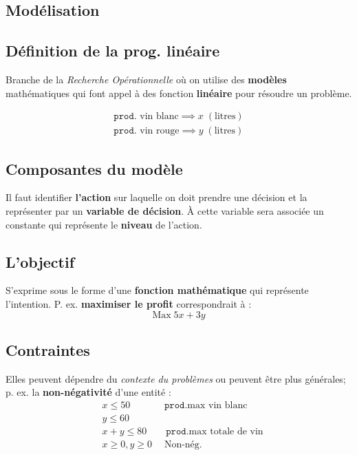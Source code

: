 \documentclass{report}
\begin{document}
\begin{multicols*}{3}
    \chapter{Modélisation}
    \footnotesize
\section{Définition de la prog. linéaire}

    Branche de la \textit{Recherche Opérationnelle} où on utilise 
    des \textbf{modèles} mathématiques qui font appel à 
    des fonction \textcolor{myb}{\textbf{linéaire}} pour 
    résoudre un problème. 

    \begin{align*}
        \texttt{prod}. \text{ vin blanc} \implies x \; (\text{litres}) \\ 
        \texttt{prod}. \text{ vin rouge} \implies y \; (\text{litres})
    \end{align*}
\section{Composantes du modèle}
    Il faut identifier \textbf{\textcolor{myb}{l'action}} sur 
    laquelle on doit prendre une décision et la représenter 
    par un \textbf{\textcolor{myb}{variable de décision}}. À cette 
    variable sera associée un constante qui représente 
    le \textbf{\textcolor{myb}{niveau}} de l'action.

\section{L'objectif} 
    S'exprime sous le forme d'une \textbf{fonction mathématique} 
    qui représente l'intention. P. ex. \textbf{maximiser le profit}
    correspondrait à : 
    \[%
        \text{Max} \; 5x + 3y 
    \]%

\section{Contraintes}
    Elles peuvent dépendre du \textit{contexte du problèmes} 
    ou peuvent être plus générales; p. ex. la 
    \textbf{non-négativité} d'une entité : 
    \begin{align*}
    &x \leq 50  \quad\quad\quad\;\; \texttt{prod}.\text{max vin blanc} \\ 
    &y \leq 60 \\
    &x +  y \leq 80  \quad\quad \texttt{prod}.\text{max totale de vin} \\ 
    &x \geq 0, y \geq 0 \quad\; \text{Non-nég.}
    \end{align*}


\end{multicols*}
\end{document}
